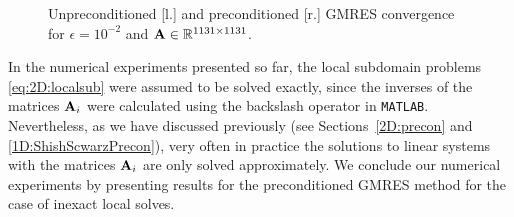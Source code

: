 \begin{figure}[tbhp]
\begin{minipage}[t]{0.5\linewidth}
\vspace*{-1em}
\end{minipage}
\vspace*{-1em}
\caption{Unpreconditioned [l.] and preconditioned [r.] GMRES convergence for $\epsilon=10^{-2}$ and $\mathbf{A} \in \mathbb{R}^{1131\times1131}$.}\label{fig:2D:prec4}
\end{figure}
%

\pagebreak
In the numerical experiments presented so far, the local subdomain problems
\eqref{eq:2D:localsub} were assumed to be solved exactly, since the inverses of
the matrices $\mathbf{A}_i$ were calculated using the backslash operator in
\texttt{MATLAB}. Nevertheless, as we have discussed previously (see
Sections~\ref{2D:precon} and \ref{1D:ShishScwarzPrecon}), very often in
practice the solutions to linear systems with the matrices $\mathbf{A}_i$ are only
solved approximately. We conclude our numerical experiments by
presenting results for the preconditioned GMRES method for the case of inexact
local solves.
%
%

